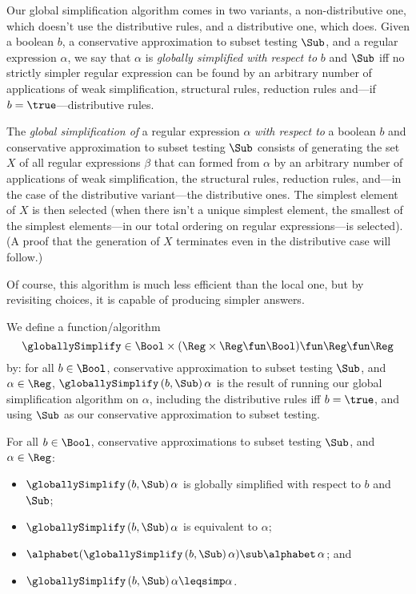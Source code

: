 Our global simplification algorithm comes in two variants, a
non-distributive one, which doesn't use the distributive rules, and a
distributive one, which does.  Given a boolean $b$, a conservative
approximation to subset testing $\Sub$, and a regular expression
$\alpha$, we say that $\alpha$ is \emph{globally simplified with
  respect to} $b$ and $\Sub$ iff no strictly simpler regular
expression can be found by an arbitrary number of applications of weak
simplification, structural rules, reduction rules and---if
$b=\true$---distributive rules.

The \emph{global simplification of} a regular expression $\alpha$
\emph{with respect to} a boolean $b$ and conservative approximation to
subset testing $\Sub$ consists of generating the set $X$ of all
regular expressions $\beta$ that can formed from $\alpha$ by an
arbitrary number of applications of weak simplification, the
structural rules, reduction rules, and---in the case of the
distributive variant---the distributive ones.  The simplest element of
$X$ is then selected (when there isn't a unique simplest element, the
smallest of the simplest elements---in our total ordering on regular
expressions---is selected).  (A proof that the generation of $X$
terminates even in the distributive case will follow.)

Of course, this algorithm is much less efficient than the local
one, but by revisiting choices, it is capable of producing simpler
answers.

We define a function/algorithm
\begin{displaymath}
\globallySimplify\in\Bool\times(\Reg\times\Reg\fun\Bool)\fun\Reg\fun\Reg 
\end{displaymath}
by: for all $b\in\Bool$, conservative approximation to subset testing
$\Sub$, and $\alpha\in\Reg$, $\globallySimplify\,(b,\Sub)\,\alpha$ is
the result of running our global simplification algorithm on $\alpha$,
including the distributive rules iff $b=\true$, and using $\Sub$ as
our conservative approximation to subset testing.

\begin{theorem}
For all $b\in\Bool$, conservative approximations to subset testing $\Sub$, and
$\alpha\in\Reg$:
\begin{itemize}
\item $\globallySimplify\,(b,\Sub)\,\alpha$ is globally simplified with
  respect to $b$ and $\Sub$;

\item $\globallySimplify\,(b,\Sub)\,\alpha$ is equivalent to $\alpha$;

\item $\alphabet(\globallySimplify\,(b,\Sub)\,\alpha)\sub\alphabet\,\alpha$;
  and

\item $\globallySimplify\,(b,\Sub)\,\alpha\leqsimp\alpha$.
\end{itemize}
\end{theorem}

